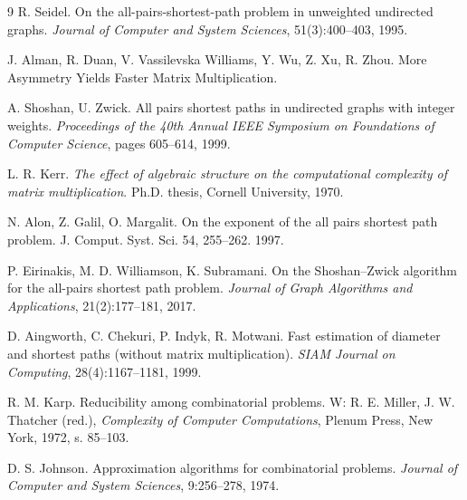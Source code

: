 \begin{thebibliography}{9}
R. Seidel.
\newblock On the all-pairs-shortest-path problem in unweighted undirected graphs.
\newblock \emph{Journal of Computer and System Sciences}, 51(3):400--403, 1995.

J. Alman, R. Duan, V. Vassilevska Williams, Y. Wu, Z. Xu, R. Zhou.
\newblock More Asymmetry Yields Faster Matrix Multiplication.

A. Shoshan, U. Zwick.
\newblock All pairs shortest paths in undirected graphs with integer weights.
\newblock \emph{Proceedings of the 40th Annual IEEE Symposium on Foundations of Computer Science}, pages 605--614, 1999.

L. R. Kerr.
\newblock \emph{The effect of algebraic structure on the computational
  complexity of matrix multiplication}.
\newblock Ph.D. thesis, Cornell University, 1970.

N. Alon, Z. Galil, O. Margalit. On the exponent of the all pairs shortest path problem.
J. Comput. Syst. Sci. 54, 255–262. 1997.

P. Eirinakis, M. D. Williamson, K. Subramani.
\newblock On the Shoshan--Zwick algorithm for the all-pairs shortest path problem.
\newblock \emph{Journal of Graph Algorithms and Applications}, 21(2):177--181, 2017.

D. Aingworth, C. Chekuri, P. Indyk, R. Motwani.
\newblock Fast estimation of diameter and shortest paths (without matrix multiplication).
\newblock \emph{SIAM Journal on Computing}, 28(4):1167--1181, 1999.

R. M. Karp.
\newblock Reducibility among combinatorial problems.
\newblock W: R. E. Miller, J. W. Thatcher (red.), \emph{Complexity of Computer Computations}, Plenum Press, New York, 1972, s. 85--103.

D. S. Johnson.
\newblock Approximation algorithms for combinatorial problems.
\newblock \emph{Journal of Computer and System Sciences}, 9:256--278, 1974.


\end{thebibliography}